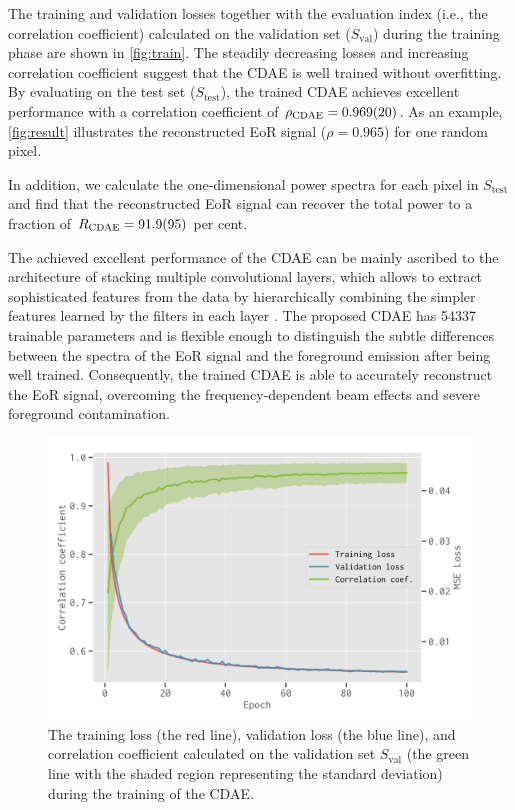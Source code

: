 \documentclass[letters,fleqn,usenatbib,onecolumn]{mnras}
\newcommand{\R}[1]{\mathrm{#1}}
\begin{document}
The training and validation losses together with the evaluation index
(i.e., the correlation coefficient) calculated on the validation set
($S_{\R{val}}$) during the training phase are shown in \autoref{fig:train}.
The steadily decreasing losses and increasing correlation coefficient
suggest that the CDAE is well trained without overfitting.
By evaluating on the test set ($S_{\R{test}}$), the trained CDAE
achieves excellent performance with a correlation coefficient of
$\rho_{\R{CDAE}} = \num{0.969 +- 0.020}$.
As an example, \autoref{fig:result} illustrates the reconstructed EoR
signal ($\rho = 0.965$) for one random pixel.
{\color{cyan}%
In addition, we calculate the one-dimensional power spectra for each
pixel in $S_{\R{test}}$ \citep[e.g.,][]{chapman2013}
and find that the reconstructed EoR signal can recover the total power
to a fraction of $R_{\R{CDAE}} = \num{91.9 +- 9.5}$ per cent.

The achieved excellent performance of the CDAE can be mainly ascribed
to the architecture of stacking multiple convolutional layers, which
allows to extract sophisticated features from the data by hierarchically
combining the simpler features learned by the filters in each layer
\citep{lecun2015}.
The proposed CDAE has \num{54337} trainable parameters and is flexible
enough to distinguish the subtle differences between the spectra of the
EoR signal and the foreground emission after being well trained.
Consequently, the trained CDAE is able to accurately reconstruct the
EoR signal, overcoming the frequency-dependent beam effects and severe
foreground contamination.}  %

\begin{figure}
  \centering
  \includegraphics[width=\myfigwidth]{cdae-train}
  \caption{\label{fig:train}%
    The training loss (the red line), validation loss (the blue line),
    and correlation coefficient calculated on the validation set
    $S_{\R{val}}$ (the green line with the shaded region representing
    the standard deviation) during the training of the CDAE.
  }
\end{figure}
\end{document}
